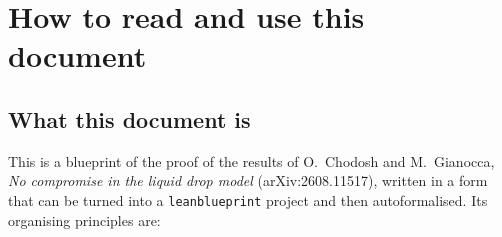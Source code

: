 \hypersetup{pageanchor=false}
\maketitle
\tableofcontents
\clearpage
\hypersetup{pageanchor=true}

\chapter*{How to read and use this document}

\section*{What this document is}

This is a blueprint of the proof of the results of O.~Chodosh and
M.~Gianocca, \emph{No compromise in the liquid drop model}
(arXiv:2608.11517), written in a form that can be turned into a
\texttt{leanblueprint} project and then autoformalised.  Its organising
principles are:

